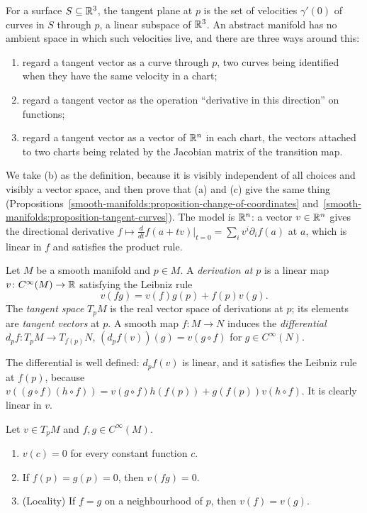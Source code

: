 For a surface $S \subseteq \mathbb{R}^3$, the tangent plane at $p$ is the set of velocities $\gamma'(0)$ of curves in $S$ through $p$, a linear subspace of $\mathbb{R}^3$.
An abstract manifold has no ambient space in which such velocities live, and there are three ways around this:
\begin{enumerate}
\item[(a)] regard a tangent vector as a curve through $p$, two curves being identified when they have the same velocity in a chart;
\item[(b)] regard a tangent vector as the operation ``derivative in this direction'' on functions;
\item[(c)] regard a tangent vector as a vector of $\mathbb{R}^n$ in each chart, the vectors attached to two charts being related by the Jacobian matrix of the
transition map.
\end{enumerate}
We take (b) as the definition, because it is visibly independent of all choices and visibly a vector space, and then prove that (a) and (c) give the same
thing (Propositions~\ref{smooth-manifolds:proposition-change-of-coordinates} and~\ref{smooth-manifolds:proposition-tangent-curves}). The model is $\mathbb{R}^n$: a
vector $v \in \mathbb{R}^n$ gives the directional derivative $f \mapsto \frac{d}{dt}f(a + tv)|_{t=0} = \sum_iv^i\partial_if(a)$ at $a$, which is linear in $f$ and satisfies
the product rule.

\begin{definition}\label{smooth-manifolds:definition-tangent-space}
Let $M$ be a smooth manifold and $p \in M$. A \emph{derivation at $p$} is a linear map $v \colon C^\infty(M) \to \mathbb{R}$ satisfying the Leibniz rule
\[
v(fg) = v(f)g(p) + f(p)v(g).
\]
The \emph{tangent space} $T_pM$ is the real vector space of derivations at $p$; its elements are \emph{tangent vectors} at $p$. A smooth map
$f \colon M \to N$ induces the \emph{differential} $d_pf \colon T_pM \to T_{f(p)}N$, $(d_pf(v))(g) = v(g \circ f)$ for $g \in C^\infty(N)$.
\end{definition}

The differential is well defined: $d_pf(v)$ is linear, and it satisfies the Leibniz rule at $f(p)$, because
$v((g \circ f)(h \circ f)) = v(g \circ f)h(f(p)) + g(f(p))v(h \circ f)$. It is clearly linear in $v$.

\begin{lemma}\label{smooth-manifolds:lemma-derivations}
Let $v \in T_pM$ and $f, g \in C^\infty(M)$.
\begin{enumerate}
\item $v(c) = 0$ for every constant function $c$.
\item If $f(p) = g(p) = 0$, then $v(fg) = 0$.
\item (Locality) If $f = g$ on a neighbourhood of $p$, then $v(f) = v(g)$.
\end{enumerate}
\end{lemma}

